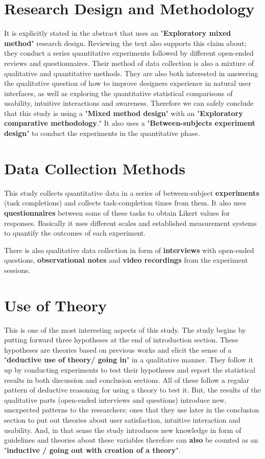 \documentclass{sigchi}
\begin{document}
\section{Research Design and Methodology}
It is explicitly stated in the abstract that \cite{10.1093/iwc/iwv003} uses an "\textbf{Exploratory mixed method}" research design. Reviewing the text also supports this claim about; they conduct a series quantitative experiments followed by different open-ended reviews and questionnaires. Their method of data collection is also a mixture of qualitative and quantitative methods. They are also both interested in answering the qualitative question of how to improve designers experience in natural user interfaces, as well as exploring the quantitative statistical comparisons of usability, intuitive interactions and awareness. Therefore we can safely conclude that this study is using a "\textbf{Mixed method design}" with an "\textbf{Exploratory comparative methodology}." It also uses a "\textbf{Between-subjects experiment design}" to conduct the experiments in the quantitative phase. 

\section{Data Collection Methods}
This study collects quantitative data in a series of between-subject \textbf{experiments} (task completions) and collects task-completion times from them. It also uses \textbf{questionnaires} between some of these tasks to obtain Likert values for responses. Basically it uses different scales and established measurement systems to quantify the outcomes of each experiment. 

There is also qualitative data collection in form of \textbf{interviews} with open-ended questions, \textbf{observational notes} and \textbf{video recordings} from the experiment sessions.

\section{Use of Theory}
This is one of the most interesting aspects of this study. The study begins by putting forward three hypotheses at the end of introduction section. These hypotheses are theories based on previous works and elicit the sense of a "\textbf{deductive use of theory/ going in}" in a qualitative manner. They follow it up by conducting experiments to test their hypotheses and report the statistical results in both discussion and conclusion sections. All of these follow a regular pattern of deductive reasoning for using a theory to test it. But, the results of the qualitative parts (open-ended interviews and questions) introduce new, unexpected patterns to the researchers; ones that they use later in the conclusion section to put out theories about user satisfaction, intuitive interaction and usability\cite{10.1093/iwc/iwv003}. And, in that sense the study introduces new knowledge in form of guidelines and theories about these variables therefore can \textbf{also} be counted as an "\textbf{inductive / going out with creation of a theory}". 
\end{document}
